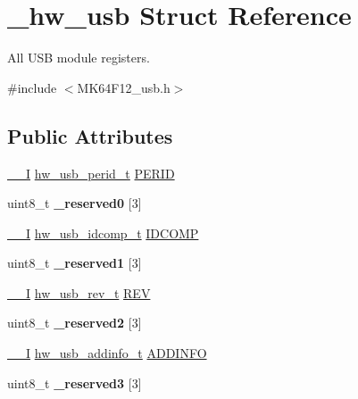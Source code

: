 \hypertarget{struct__hw__usb}{}\section{\+\_\+hw\+\_\+usb Struct Reference}
\label{struct__hw__usb}


All U\+SB module registers.  




{\ttfamily \#include $<$M\+K64\+F12\+\_\+usb.\+h$>$}

\subsection*{Public Attributes}
\begin{DoxyCompactItemize}
\item 
\hyperlink{core__sc300_8h_af63697ed9952cc71e1225efe205f6cd3}{\+\_\+\+\_\+I} \hyperlink{union__hw__usb__perid}{hw\+\_\+usb\+\_\+perid\+\_\+t} \hyperlink{struct__hw__usb_aac327b4263bb45c6c8e4c391535fbb40}{P\+E\+R\+ID}
\item 
uint8\+\_\+t {\bfseries \+\_\+reserved0} \mbox{[}3\mbox{]}\hypertarget{struct__hw__usb_a17e5bb6c32c78adb106cae2937d8a869}{}\label{struct__hw__usb_a17e5bb6c32c78adb106cae2937d8a869}

\item 
\hyperlink{core__sc300_8h_af63697ed9952cc71e1225efe205f6cd3}{\+\_\+\+\_\+I} \hyperlink{union__hw__usb__idcomp}{hw\+\_\+usb\+\_\+idcomp\+\_\+t} \hyperlink{struct__hw__usb_a91ebe70e4196a719cd43ab1de52f30a6}{I\+D\+C\+O\+MP}
\item 
uint8\+\_\+t {\bfseries \+\_\+reserved1} \mbox{[}3\mbox{]}\hypertarget{struct__hw__usb_a514ddc076b5a4e81190dd375d69ec9d5}{}\label{struct__hw__usb_a514ddc076b5a4e81190dd375d69ec9d5}

\item 
\hyperlink{core__sc300_8h_af63697ed9952cc71e1225efe205f6cd3}{\+\_\+\+\_\+I} \hyperlink{union__hw__usb__rev}{hw\+\_\+usb\+\_\+rev\+\_\+t} \hyperlink{struct__hw__usb_a39b122e8ed52ba75da008496cf4f16ff}{R\+EV}
\item 
uint8\+\_\+t {\bfseries \+\_\+reserved2} \mbox{[}3\mbox{]}\hypertarget{struct__hw__usb_a79a0351eb2a1937b7dd92fa1edbab13a}{}\label{struct__hw__usb_a79a0351eb2a1937b7dd92fa1edbab13a}

\item 
\hyperlink{core__sc300_8h_af63697ed9952cc71e1225efe205f6cd3}{\+\_\+\+\_\+I} \hyperlink{union__hw__usb__addinfo}{hw\+\_\+usb\+\_\+addinfo\+\_\+t} \hyperlink{struct__hw__usb_a1c9f97bf342a7856ed85df0ad2d73876}{A\+D\+D\+I\+N\+FO}
\item 
uint8\+\_\+t {\bfseries \+\_\+reserved3} \mbox{[}3\mbox{]}\hypertarget{struct__hw__usb_a077b4265008765ccd5032acdeb71c555}{}\label{struct__hw__usb_a077b4265008765ccd5032acdeb71c555}


\end{DoxyCompactItemize}
